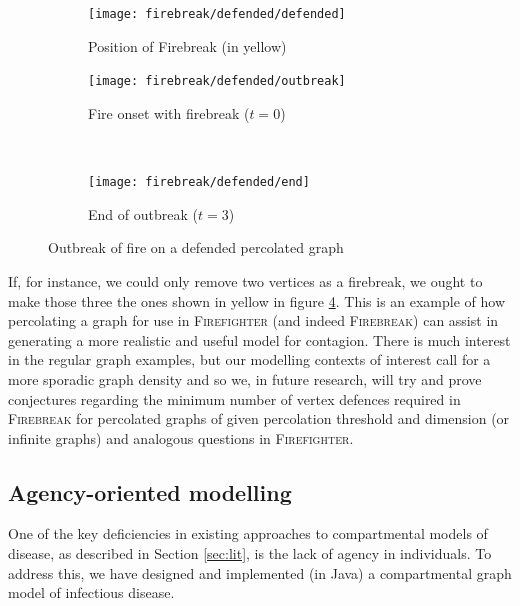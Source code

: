 \documentclass[../report.tex]{subfiles}
\begin{document}
\begin{figure}[ht] 
\begin{centering}
  \begin{subfigure}{0.4\linewidth}
    \centering
    \texttt{[image: firebreak/defended/defended]} 
    \caption{Position of Firebreak (in yellow)} 
    \label{fig:defended} 
  \end{subfigure}%
  \begin{subfigure}{0.4\linewidth}
    \centering
    \texttt{[image: firebreak/defended/outbreak]} 
    \caption{Fire onset with firebreak ($t=0$)} 
    \label{fig:afterperc_break} 
  \end{subfigure}\\[1ex] 
  \begin{subfigure}{0.4\linewidth}
    \centering
    \texttt{[image: firebreak/defended/end]} 
    \caption{End of outbreak ($t=3$)} 
    \label{fig:end_defended} 
  \end{subfigure} 
  \caption{Outbreak of fire on a defended percolated graph}
  \label{fig:percolated_defended} 
  \end{centering}
\end{figure}

If, for instance, we could only remove two vertices as a firebreak, we ought to make those three the ones shown in yellow in figure \ref{fig:percolated_defended}. This is an example of how percolating a graph for use in {\scshape Firefighter} (and indeed {\scshape Firebreak}) can assist in generating a more realistic and useful model for contagion. There is much interest in the regular graph examples, but our modelling contexts of interest call for a more sporadic graph density and so we, in future research, will try and prove conjectures regarding the minimum number of vertex defences required in {\scshape Firebreak} for percolated graphs of given percolation threshold and dimension (or infinite graphs) and analogous questions in {\scshape Firefighter}.

\subsection{Agency-oriented modelling}

One of the key deficiencies in existing approaches to compartmental models of disease, as described in Section \ref{sec:lit}, is the lack of agency in individuals. To address this, we have designed and implemented (in Java) a compartmental graph model of infectious disease.
\end{document}
